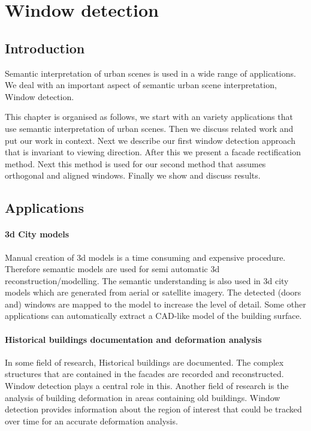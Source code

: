 
\section{Window detection}
\label{sec:windowDetection}
\subsection{Introduction}
Semantic interpretation of urban scenes is used in a wide range of applications.
We deal with an important aspect of semantic urban scene interpretation, Window detection. 

This chapter is organised as follows, we start with an variety applications that
use semantic interpretation of urban scenes.  Then we discuss related work and
put our work in context.  Next we describe our first window detection approach
that is invariant to viewing direction.  After this we present a facade
rectification method. Next this method is used for our second method that assumes
orthogonal and aligned windows.  Finally we show and discuss results. 

\subsection{Applications}
\paragraph{3d City models} 
	Manual creation of 3d models is a time consuming and expensive procedure.
	Therefore semantic models are used for semi automatic 3d
	reconstruction/modelling.
	The semantic understanding is also used in 3d city models which are
	generated from aerial or satellite imagery.  The detected (doors and)
	windows are mapped to the model to increase the level of detail. 
	Some other applications can automatically extract a CAD-like model of
	the building surface.

\paragraph{Historical buildings documentation and deformation analysis}
	In some field of research, Historical buildings are documented. The complex
	structures that are contained in the facades are recorded and reconstructed.
	Window detection plays a central role in this. 
	Another field of research is the analysis of building deformation in areas
	containing old buildings.  Window detection provides information about the
	region of interest that could be tracked over time for an accurate
	deformation analysis.


